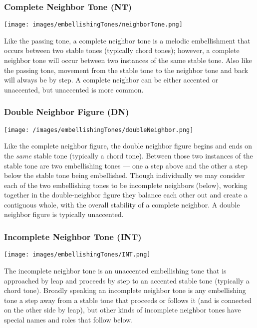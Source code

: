 \documentclass{book}
\begin{document}
\hypertarget{complete-neighbor-tone-nt}{%
\subsubsection{Complete Neighbor Tone (NT)}\label{complete-neighbor-tone-nt}}

\texttt{[image: images/embellishingTones/neighborTone.png]}

Like the passing tone, a complete neighbor tone is a melodic embellishment
that occurs between two stable tones (typically chord tones); however, a
complete neighbor tone will occur between two instances of the same stable
tone. Also like the passing tone, movement from the stable tone to the
neighbor tone and back will always be by step. A complete neighbor can be
either accented or unaccented, but unaccented is more common.

\hypertarget{double-neighbor-figure-dn}{%
\subsubsection{Double Neighbor Figure (DN)}\label{double-neighbor-figure-dn}}

\texttt{[image: /images/embellishingTones/doubleNeighbor.png]}

Like the complete neighbor figure, the double neighbor figure begins and ends
on the \emph{same} stable tone (typically a chord tone). Between those two
instances of the stable tone are two embellishing tones --- one a step above
and the other a step below the stable tone being embellished. Though
individually we may consider each of the two embellishing tones to be
incomplete neighbors (below), working together in the double-neighbor figure
they balance each other out and create a contiguous whole, with the overall
stability of a complete neighbor. A double neighbor figure is typically
unaccented.

\hypertarget{incomplete-neighbor-tone-int-1}{%
\subsubsection{Incomplete Neighbor Tone
(INT)}\label{incomplete-neighbor-tone-int-1}}

\texttt{[image: images/embellishingTones/INT.png]}

The incomplete neighbor tone is an unaccented embellishing tone that is
approached by leap and proceeds by step to an accented stable tone (typically
a chord tone). Broadly speaking an incomplete neighbor tone is any
embellishing tone a step away from a stable tone that proceeds or follows it
(and is connected on the other side by leap), but other kinds of incomplete
neighbor tones have special names and roles that follow below.
\end{document}
